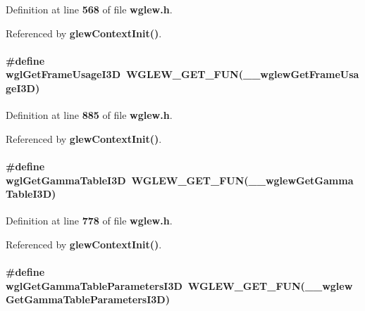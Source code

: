 Definition at line {\bf 568} of file {\bf wglew.\+h}.



Referenced by {\bf glew\+Context\+Init()}.

\paragraph[{wgl\+Get\+Frame\+Usage\+I3D}]{\setlength{\rightskip}{0pt plus 5cm}\#define wgl\+Get\+Frame\+Usage\+I3D~{\bf W\+G\+L\+E\+W\+\_\+\+G\+E\+T\+\_\+\+F\+UN}({\bf \+\_\+\+\_\+wglew\+Get\+Frame\+Usage\+I3D})}\label{wglew_8h_ab0c98db93e1eb69ceb2ed6679066deb3}


Definition at line {\bf 885} of file {\bf wglew.\+h}.



Referenced by {\bf glew\+Context\+Init()}.

\paragraph[{wgl\+Get\+Gamma\+Table\+I3D}]{\setlength{\rightskip}{0pt plus 5cm}\#define wgl\+Get\+Gamma\+Table\+I3D~{\bf W\+G\+L\+E\+W\+\_\+\+G\+E\+T\+\_\+\+F\+UN}({\bf \+\_\+\+\_\+wglew\+Get\+Gamma\+Table\+I3D})}\label{wglew_8h_a612373debebec906c05048cf0410c649}


Definition at line {\bf 778} of file {\bf wglew.\+h}.



Referenced by {\bf glew\+Context\+Init()}.

\paragraph[{wgl\+Get\+Gamma\+Table\+Parameters\+I3D}]{\setlength{\rightskip}{0pt plus 5cm}\#define wgl\+Get\+Gamma\+Table\+Parameters\+I3D~{\bf W\+G\+L\+E\+W\+\_\+\+G\+E\+T\+\_\+\+F\+UN}({\bf \+\_\+\+\_\+wglew\+Get\+Gamma\+Table\+Parameters\+I3D})}\label{wglew_8h_a31d0b176918ce4378283bd990e878f1e}


